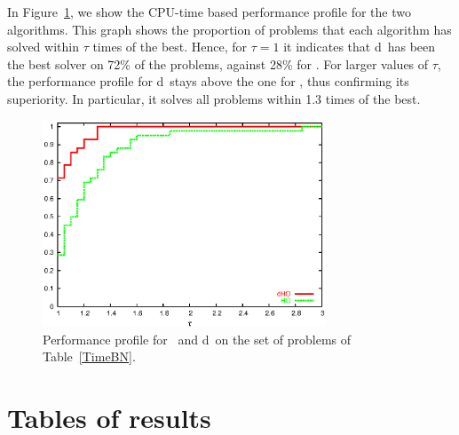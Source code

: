 In Figure~\ref{fig:PerfProfile}, we show the CPU-time based 
performance profile \cite{DolanMore} for the two algorithms. 
This graph shows the proportion of problems that each algorithm
has solved within $\tau$ times of the best. Hence, for
$\tau = 1$ it indicates that d\HO\ has been the best solver on 72\%
of the problems, against 28\% for \HO. For larger values of $\tau$,
the performance profile for d\HO\ stays above the one for \HO, thus
confirming its superiority. In particular, it solves all problems
within 1.3 times of the best.
%
\begin{figure}[ht]
  \centering
  \includegraphics[width=0.75\textwidth]{figures/perfprof-BN.eps}
  \caption{Performance profile for \HO\ and d\HO\ on the set of problems
    of Table~\ref{TimeBN}.}
  \label{fig:PerfProfile}
\end{figure}

\section{Tables of results}
\setlength{\tabcolsep}{4.2pt}

%
%

